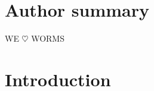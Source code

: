 \documentclass[10pt,letterpaper]{article}
\begin{document}
\section*{Author summary}
WE $\heartsuit$ WORMS

\linenumbers

\section*{Introduction}

%
%
%
%
\end{document}
